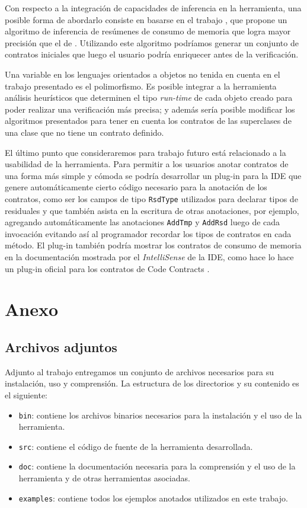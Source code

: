 \documentclass[12pt,a4paper]{article}
\newcommand\mono[1]{\texttt{#1}}
\begin{document}
		Con respecto a la integración de capacidades de inferencia en la herramienta, una posible forma de abordarlo consiste en basarse en el trabajo \cite{testisKrasnyGrunberg}, que propone un algoritmo de inferencia de resúmenes de consumo de memoria que logra mayor precisión que el de \cite{Rou09}. Utilizando este algoritmo podríamos generar un conjunto de contratos iniciales que luego el usuario podría enriquecer antes de la verificación.

		Una variable en los lenguajes orientados a objetos no tenida en cuenta en el trabajo presentado es el polimorfismo. Es posible integrar a la herramienta análisis heurísticos que determinen el tipo \textit{run-time} de cada objeto creado para poder realizar una verificación más precisa; y además sería posible modificar los algoritmos presentados para tener en cuenta los contratos de las superclases de una clase que no tiene un contrato definido.

		El último punto que consideraremos para trabajo futuro está relacionado a la usabilidad de la herramienta. Para permitir a los usuarios anotar contratos de una forma más simple y cómoda se podría desarrollar un plug-in para la IDE que genere automáticamente cierto código necesario para la anotación de los contratos, como ser los campos de tipo \mono{RsdType} utilizados para declarar tipos de residuales y que también asista en la escritura de otras anotaciones, por ejemplo, agregando automáticamente las anotaciones \mono{AddTmp} y \mono{AddRsd} luego de cada invocación evitando así al programador recordar los tipos de contratos en cada método. El plug-in también podría mostrar los contratos de consumo de memoria en la documentación mostrada por el \textit{IntelliSense} de la IDE, como hace lo hace un plug-in oficial para los contratos de Code Contracts \cite{pluginCC}.
	\newpage
	\section{Anexo} \label{sec:anexo}
		\subsection{Archivos adjuntos}
			Adjunto al trabajo entregamos un conjunto de archivos necesarios para su instalación, uso y comprensión. La estructura de los directorios y su contenido es el siguiente:
			\begin{itemize}
				\item \mono{bin}: contiene los archivos binarios necesarios para la instalación y el uso de la herramienta.
				\item \mono{src}: contiene el código de fuente de la herramienta desarrollada.
				\item \mono{doc}: contiene la documentación necesaria para la comprensión y el uso de la herramienta y de otras herramientas asociadas.
				\item \mono{examples}: contiene todos los ejemplos anotados utilizados en este trabajo.
			\end{itemize}
\end{document}
